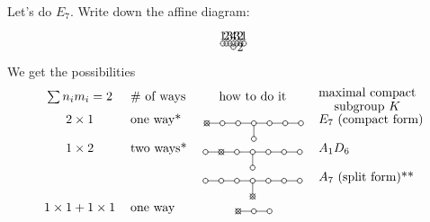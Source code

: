  \begin{example}
   Let's do $E_7$. Write down the affine diagram:
   \[
   \begin{xy}
      (0,0) *+!D{1} *\cir<2pt>{};
      p+(1,0) *+!D{2} *\cir<2pt>{} **@{-};
      p+(1,0) *+!D{3} *\cir<2pt>{} **@{-};
      p+(1,0) *+!D{4} *\cir<2pt>{} **@{-};
           p+(0,-1) *+!L{2} *\cir<2pt>{} **@{-},
      p+(1,0) *+!D{3} *\cir<2pt>{} **@{-};
      p+(1,0) *+!D{2} *\cir<2pt>{} **@{-};
      p+(1,0) *+!D{1} *\cir<2pt>{} **@{-};
    \end{xy}
   \]
   We get the possibilities
    \[
   \begin{tabular}{clcl}
     $\sum n_im_i=2$ & \# of ways & how to do it & \txt{maximal compact\\ subgroup $K$}\\
     $2\times 1$ & one way* &
      \begin{xy}<1.25em,0em>:
         (0,0) *{\times} *\cir<2pt>{};
         p+(1,0) *\cir<2pt>{} **@{-};
         p+(1,0) *\cir<2pt>{} **@{-};
         p+(1,0) *\cir<2pt>{} **@{-};
              p+(0,-1) *\cir<2pt>{} **@{-},
         p+(1,0) *\cir<2pt>{} **@{-};
         p+(1,0) *\cir<2pt>{} **@{-};
         p+(1,0) *\cir<2pt>{} **@{-};
       \end{xy} & $E_7$ (compact form)\\
     $1\times 2$ & two ways*&
      \begin{xy}<1.25em,0em>:
         (0,0) *\cir<2pt>{};
         p+(1,0) *{\times} *\cir<2pt>{} **@{-};
         p+(1,0) *\cir<2pt>{} **@{-};
         p+(1,0) *\cir<2pt>{} **@{-};
              p+(0,-1) *\cir<2pt>{} **@{-},
         p+(1,0) *\cir<2pt>{} **@{-};
         p+(1,0) *\cir<2pt>{} **@{-};
         p+(1,0) *\cir<2pt>{} **@{-};
       \end{xy} & $A_1 D_6$\\
     & &
      \begin{xy}<1.25em,0em>:
         (0,0) *\cir<2pt>{};
         p+(1,0) *\cir<2pt>{} **@{-};
         p+(1,0) *\cir<2pt>{} **@{-};
         p+(1,0) *\cir<2pt>{} **@{-};
              p+(0,-1) *{\times} *\cir<2pt>{} **@{-},
         p+(1,0) *\cir<2pt>{} **@{-};
         p+(1,0) *\cir<2pt>{} **@{-};
         p+(1,0) *\cir<2pt>{} **@{-};
       \end{xy} & $A_7$ (split form)**\\
     $1\times 1+1\times 1$ & one way &
      \begin{xy}<1.25em,0em>:
         (0,0) *{\times} *\cir<2pt>{};
         p+(1,0) *\cir<2pt>{} **@{-};
         p+(1,0) *\cir<2pt>{} **@{-};

\end{xy}
\end{tabular}\]
\end{example}
